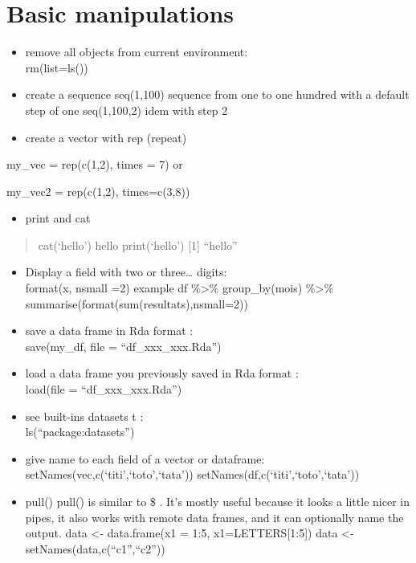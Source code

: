 \documentclass[
]{book}
\providecommand{\tightlist}{%
  \setlength{\itemsep}{0pt}\setlength{\parskip}{0pt}}
\begin{document}
\hypertarget{basic-manipulations}{%
\section{Basic manipulations}\label{basic-manipulations}}

\begin{itemize}
\item
  remove all objects from current environment:\\
  rm(list=ls())
\item
  create a sequence
  seq(1,100) sequence from one to one hundred with a default step of one
  seq(1,100,2) idem with step 2
\item
  create a vector with rep (repeat)
\end{itemize}

my\_vec = rep(c(1,2), times = 7)
or

my\_vec2 = rep(c(1,2), times=c(3,8))

\begin{itemize}
\tightlist
\item
  print and cat
\end{itemize}

\begin{quote}
cat(`hello')
hello
print(`hello')
{[}1{]} ``hello''
\end{quote}

\begin{itemize}
\item
  Display a field with two or three\ldots{} digits:\\
  format(x, nsmall =2)
  example
  df \%\textgreater\% group\_by(mois) \%\textgreater\% summarise(format(sum(resultats),nsmall=2))
\item
  save a data frame in Rda format :\\
  save(my\_df, file = ``df\_xxx\_xxx.Rda'')
\item
  load a data frame you previously saved in Rda format :\\
  load(file = ``df\_xxx\_xxx.Rda'')
\item
  see built-ins datasets t :\\
  ls(``package:datasets'')
\item
  give name to each field of a vector or dataframe:
  setNames(vec,c(`titi',`toto',`tata'))
  setNames(df,c(`titi',`toto',`tata'))
\item
  pull()
  pull() is similar to \$ . It's mostly useful because it looks a little nicer in pipes, it also works with remote data frames, and it can optionally name the output.
  data \textless- data.frame(x1 = 1:5, x1=LETTERS{[}1:5{]})
  data \textless- setNames(data,c(``c1'',``c2''))
\end{itemize}
\end{document}

